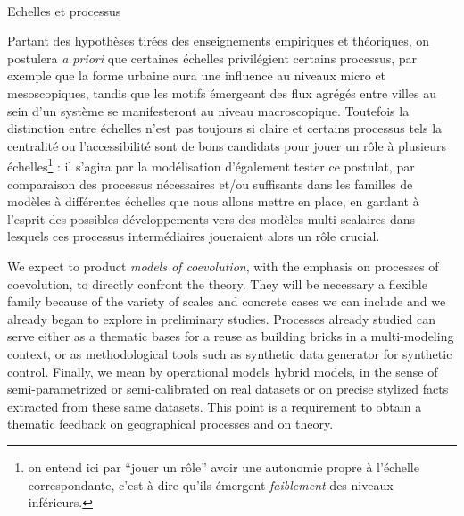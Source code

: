 


\paragraph{}{Echelles et processus}

Partant des hypothèses tirées des enseignements empiriques et théoriques, on postulera \emph{a priori} que certaines échelles privilégient certains processus, par exemple que la forme urbaine aura une influence au niveaux micro et mesoscopiques, tandis que les motifs émergeant des flux agrégés entre villes au sein d'un système se manifesteront au niveau macroscopique. Toutefois la distinction entre échelles n'est pas toujours si claire et certains processus tels la centralité ou l'accessibilité sont de bons candidats pour jouer un rôle à plusieurs échelles\footnote{on entend ici par ``jouer un rôle'' avoir une autonomie propre à l'échelle correspondante, c'est à dire qu'ils émergent \emph{faiblement}  des niveaux inférieurs.}
 : il s'agira par la modélisation d'également tester ce postulat, par comparaison des processus nécessaires et/ou suffisants dans les familles de modèles à différentes échelles que nous allons mettre en place, en gardant à l'esprit des possibles développements vers des modèles multi-scalaires dans lesquels ces processus intermédiaires joueraient alors un rôle crucial.



We expect to product \emph{models of coevolution}, 
 with the emphasis on processes of coevolution, to directly confront the theory. They will be necessary a flexible family because of the variety of scales and concrete cases we can include and we already began to explore in preliminary studies. Processes already studied can serve either as a thematic bases for a reuse as building bricks in a multi-modeling context, or as methodological tools such as synthetic data generator for synthetic control. Finally, we mean by operational models hybrid models, in the sense of semi-parametrized or semi-calibrated on real datasets or on precise stylized facts extracted from these same datasets. This point is a requirement to obtain a thematic feedback on geographical processes and on theory.













